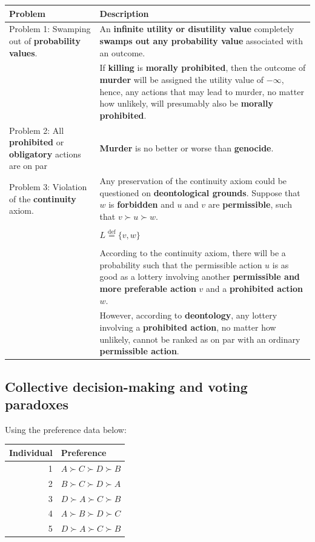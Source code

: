 \documentclass[11pt]{article}
\newcommand{\defequal}{\stackrel{\scriptscriptstyle\mathrm{def}}{=}}
\begin{document}
\begin{center}
\begin{tabular}{|m{8em}|m{30em}|}
\hline
Problem & Description\\
\hline
Problem 1: Swamping out of \textbf{probability values}. & An \textbf{infinite utility or disutility value} completely \textbf{swamps out any probability value} associated with an outcome.\\
 & If \textbf{killing} is \textbf{morally prohibited}, then the outcome of \textbf{murder} will be assigned the utility value of \(-\infty\), hence, any actions that may lead to murder, no matter how unlikely, will presumably also be \textbf{morally prohibited}.\\
\hline
Problem 2: All \textbf{prohibited} or \textbf{obligatory} actions are on par & \textbf{Murder} is no better or worse than \textbf{genocide}.\\
\hline
Problem 3: Violation of the \textbf{continuity} axiom. & Any preservation of the continuity axiom could be questioned on \textbf{deontological grounds}. Suppose that \(w\) is \textbf{forbidden} and \(u\) and \(v\) are \textbf{permissible}, such that \(v \succ u \succ w\).\\
 & \\
 & \(L \defequal \{v, w\}\)\\
 & \\
 & According to the continuity axiom, there will be a probability such that the permissible action \(u\) is as good as a lottery involving another \textbf{permissible and more preferable action} \(v\) and a \textbf{prohibited action} \(w\).\\
 & However, according to \textbf{deontology}, any lottery involving a \textbf{prohibited action}, no matter how unlikely, cannot be ranked as on par with an ordinary \textbf{permissible action}.\\
\hline
\end{tabular}
\end{center}
 \newpage
\subsection{Collective decision-making and voting paradoxes}
\label{sec:org3113512}
Using the preference data below:
\begin{center}
\begin{tabular}{r|l}
Individual & Preference\\
\hline
1 & \(A \succ C \succ D \succ B\)\\
2 & \(B \succ C \succ D \succ A\)\\
3 & \(D \succ A \succ C \succ B\)\\
4 & \(A \succ B \succ D \succ C\)\\
5 & \(D \succ A \succ C \succ B\)\\
\end{tabular}
\end{center}
\end{document}
